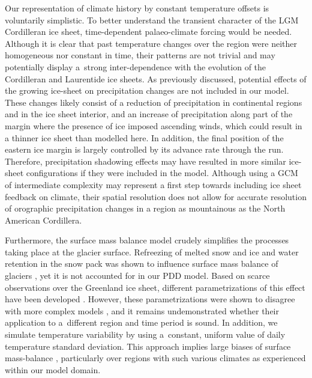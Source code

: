 \documentclass[tc, ms]{copernicus}
\begin{document}
Our representation of climate history by constant temperature offsets is voluntarily simplistic. To better understand the transient character of the LGM Cordilleran ice sheet, time-dependent palaeo-climate forcing would be needed. Although it is clear that past temperature changes over the region were neither homogeneous nor constant in time, their patterns are not trivial and may potentially display a~strong inter-dependence with the evolution of the Cordilleran and Laurentide ice sheets. As previously discussed, potential effects of the growing ice-sheet on precipitation changes are not included in our model. These changes likely consist of a reduction of precipitation in continental regions and in the ice sheet interior, and an increase of precipitation along part of the margin where the presence of ice imposed ascending winds, which could result in a thinner ice sheet than modelled here. In addition, the final position of the eastern ice margin is largely controlled by its advance rate through the run. Therefore, precipitation shadowing effects may have resulted in more similar ice-sheet configurations if they were included in the model. Although using a GCM of intermediate complexity \citep{yoshimori-etal-2001,calov-etal-2002,abeouchi-etal-2007,charbit-etal-2013} may represent a first step towards including ice sheet feedback on climate, their spatial resolution does not allow for accurate resolution of orographic precipitation changes in a region as mountainous as the North American Cordillera.

Furthermore, the surface mass balance model crudely simplifies the processes taking place at the glacier surface. Refreezing of melted snow and ice and water retention in the snow pack was shown to influence surface mass balance of glaciers \citep{trabant-mayo-1985}, yet it is not accounted for in our PDD model. Based on scarce observations over the Greenland ice sheet, different parametrizations of this effect have been developed \citep{janssens-huybrechts-2000,fausto-etal-2009b}. However, these parametrizations were shown to disagree with more complex models \citep{reijmer-etal-2012}, and it remains undemonstrated whether their application to a~different region and time period is sound. In addition, we simulate temperature variability by using a~constant, uniform value of daily temperature standard deviation. This approach implies large biases of surface mass-balance \citep{charbit-etal-2013,rau-rogozhina-2013,seguinot-2013}, particularly over regions with such various climates as experienced within our model domain.
\end{document}
